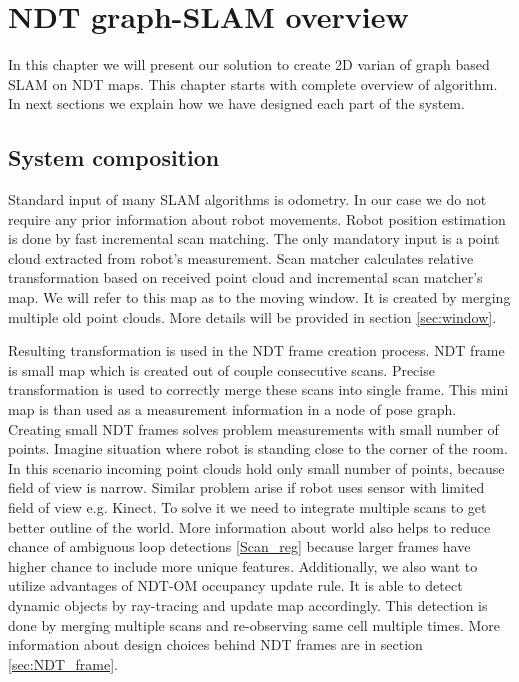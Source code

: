 \chapter{NDT graph-SLAM overview}
In this chapter we will present our solution to create 2D varian of graph based \gls{SLAM} on \gls{NDT} maps. This chapter starts with complete overview of algorithm. In next sections we explain how we have designed each part of the system.
\section{System composition}
\label{sec:Sys_arch}

Standard input of many \gls{SLAM} algorithms is odometry. In our case we do not require any prior information about robot movements. Robot position estimation is done by fast incremental scan matching. The only mandatory input is a point cloud extracted from robot's measurement. Scan matcher calculates relative transformation based on received point cloud and incremental scan matcher's map. We will refer to this map as to the moving window. It is created by merging multiple old point clouds. More details will be provided in section \ref{sec:window}.

Resulting transformation is used in the \gls{NDT} frame creation process. \gls{NDT} frame is small map which is created out of couple consecutive scans. Precise transformation is used to correctly merge these scans into single frame. This mini map is than used as a measurement information in a node of pose graph. Creating small \gls{NDT} frames solves problem measurements with small number of points. Imagine situation where robot is standing close to the corner of the room. In this scenario incoming point clouds hold only small number of points, because field of view is narrow. Similar problem arise if robot uses sensor with limited field of view e.g. Kinect. To solve it we need to integrate multiple scans to get better outline of the world. More information about world also helps to reduce chance of ambiguous loop detections \ref{Scan_reg} because larger frames have higher chance to include more unique features. Additionally, we also want to utilize advantages of \gls{NDT-OM} occupancy update rule. It is able to detect dynamic objects by ray-tracing and update map accordingly. This detection is done by merging multiple scans and re-observing same cell multiple times. More information about design choices behind \gls{NDT} frames are in section \ref{sec:NDT_frame}.


